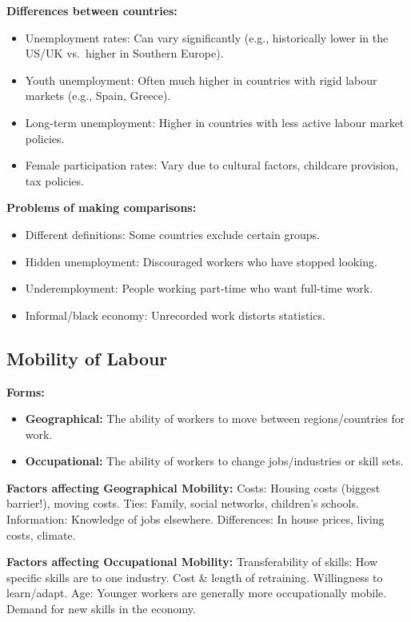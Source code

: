 \documentclass[11pt, a4paper, twoside]{book}
\begin{document}
\textbf{Differences between countries:}
\begin{itemize}
  \item Unemployment rates: Can vary significantly (e.g., historically lower in the US/UK vs.\ higher in Southern Europe).
  \item Youth unemployment: Often much higher in countries with rigid labour markets (e.g., Spain, Greece).
  \item Long-term unemployment: Higher in countries with less active labour market policies.
  \item Female participation rates: Vary due to cultural factors, childcare provision, tax policies.
\end{itemize}

\textbf{Problems of making comparisons:}
\begin{itemize}
  \item Different definitions: Some countries exclude certain groups.
  \item Hidden unemployment: Discouraged workers who have stopped looking.
  \item Underemployment: People working part-time who want full-time work.
  \item Informal/black economy: Unrecorded work distorts statistics.
\end{itemize}

\subsection{Mobility of Labour}

\textbf{Forms:}
\begin{itemize}
  \item \textbf{Geographical:} The ability of workers to move between regions/countries for work.
  \item \textbf{Occupational:} The ability of workers to change jobs/industries or skill sets.
\end{itemize}

\textbf{Factors affecting Geographical Mobility:} Costs: Housing costs (biggest barrier!), moving costs. Ties: Family, social networks, children's schools. Information: Knowledge of jobs elsewhere. Differences: In house prices, living costs, climate.

\textbf{Factors affecting Occupational Mobility:} Transferability of skills: How specific skills are to one industry. Cost \& length of retraining. Willingness to learn/adapt. Age: Younger workers are generally more occupationally mobile. Demand for new skills in the economy.
\end{document}
